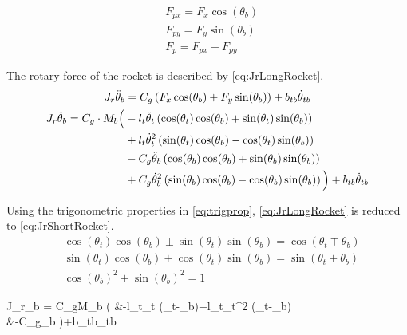 		
		\begin{subequations}\label{eq:perpFxFyRocket}
			\begin{flalign}
				& F_{px}=F_x\cos(\theta_b) \\
				& F_{py}=F_y\sin(\theta_b)  \\
				& F_p = F_{px}+F_{py} 
			\end{flalign}
		\end{subequations}
		
		The rotary force of the rocket is described by \vref{eq:JrLongRocket}.
		\begin{subequations}
			\begin{flalign}
				J_r\ddot{\theta}_b &=C_g\left(F_x\cos(\theta_b)+F_y\sin(\theta_b)\right)+b_{tb}\dot{\theta}_{tb}  \\
				J_r\ddot{\theta}_b = C_g \cdot M_b \Big( &-l_t\ddot{\theta}_t\left(\cos(\theta_t)\cos(\theta_b)+\sin(\theta_t)\sin(\theta_b)\right) \notag \\
				& +l_t\dot{\theta}_t^2\left(\sin(\theta_t)\cos(\theta_b)-\cos(\theta_t)\sin(\theta_b)\right) \notag \\
				& -C_g\ddot{\theta}_b\left(\cos(\theta_b)\cos(\theta_b)+\sin(\theta_b)\sin(\theta_b)\right) \notag \\
				& +C_g\dot{\theta}_b^2\left(\sin(\theta_b)\cos(\theta_b)-\cos(\theta_b)\sin(\theta_b)\right)  \notag \Big)+b_{tb}\dot{\theta}_{tb} \label{eq:JrLongRocket}
			\end{flalign}
		\end{subequations}
		\startexplain
		\stopexplain
		
		Using the trigonometric properties in \vref{eq:trigprop}, \autoref{eq:JrLongRocket} is reduced to \vref{eq:JrShortRocket}.
		\begin{subequations} \label{eq:trigprop}
			\begin{flalign}
				& \cos(\theta_t)\cos(\theta_b)\pm \sin(\theta_t)\sin(\theta_b)=\cos(\theta_t \mp \theta_b)  \\
				& \sin(\theta_t)\cos(\theta_b)\pm \cos(\theta_t)\sin(\theta_b) = \sin(\theta_t \pm \theta_b) \\ 
				& \cos(\theta_b)^2+\sin(\theta_b)^2=1 
			\end{flalign}
		\end{subequations}
		\begin{flalign}
			J_r\ddot{\theta}_b = C_gM_b \Big( &-l_t\ddot{\theta}_t \cos(\theta_t-\theta_b)+l_t\dot{\theta}_t^2 \sin(\theta_t-\theta_b) \notag \\
			&-C_g\ddot{\theta}_b \Big)+b_{tb}\dot{\theta}_{tb} \label{eq:JrShortRocket}
		\end{flalign}
		

